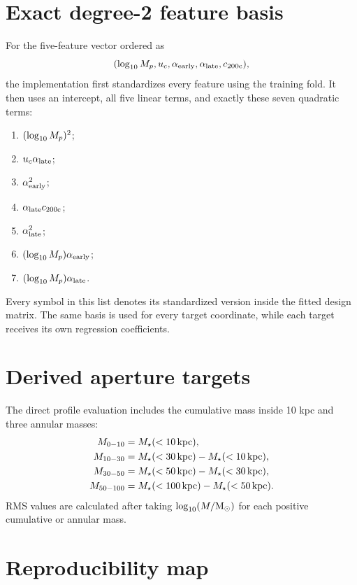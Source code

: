 \section{Exact degree-2 feature basis}
\label{app:basis}

For the five-feature vector ordered as
\begin{equation}
  (\log_{10} M_p,u_c,\alpha_{\rm early},\alpha_{\rm late},c_{200\mathrm{c}}),
\end{equation}
the implementation first standardizes every feature using the training fold.
It then uses an intercept, all five linear terms, and exactly these seven
quadratic terms:
\begin{enumerate}
  \item $(\log_{10} M_p)^2$;
  \item $u_c\alpha_{\rm late}$;
  \item $\alpha_{\rm early}^2$;
  \item $\alpha_{\rm late}c_{200\mathrm{c}}$;
  \item $\alpha_{\rm late}^2$;
  \item $(\log_{10} M_p)\alpha_{\rm early}$;
  \item $(\log_{10} M_p)\alpha_{\rm late}$.
\end{enumerate}
Every symbol in this list denotes its standardized version inside the fitted
design matrix. The same basis is used for every target coordinate, while each
target receives its own regression coefficients.

\section{Derived aperture targets}
\label{app:apertures}

The direct profile evaluation includes the cumulative mass inside 10 kpc and
three annular masses:
\begin{align}
  M_{0-10} &= M_\star(<10\,\mathrm{kpc}),\\
  M_{10-30} &= M_\star(<30\,\mathrm{kpc})-M_\star(<10\,\mathrm{kpc}),\\
  M_{30-50} &= M_\star(<50\,\mathrm{kpc})-M_\star(<30\,\mathrm{kpc}),\\
  M_{50-100} &= M_\star(<100\,\mathrm{kpc})-M_\star(<50\,\mathrm{kpc}).
\end{align}
RMS values are calculated after taking $\log_{10}(M/\mathrm{M}_{\odot})$ for each positive
cumulative or annular mass.

\section{Reproducibility map}
\label{app:reproducibility}

